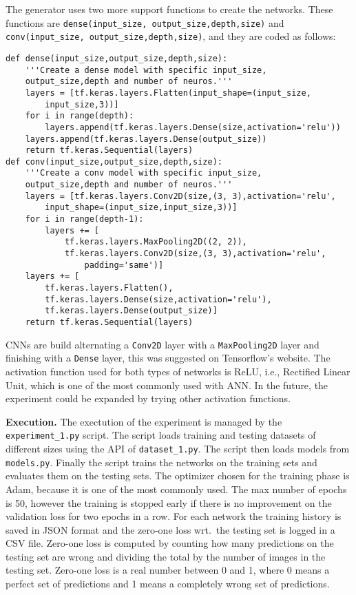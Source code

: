 The generator uses two more support functions to create the networks. These functions are \texttt{dense(input\_size, output\_size,depth,size)} and \texttt{conv(input\_size, output\_size,depth,size)}, and they are coded as follows:
\begin{verbatim}
def dense(input_size,output_size,depth,size):
    '''Create a dense model with specific input_size,
    output_size,depth and number of neuros.'''
    layers = [tf.keras.layers.Flatten(input_shape=(input_size,
        input_size,3))]
    for i in range(depth):
        layers.append(tf.keras.layers.Dense(size,activation='relu'))
    layers.append(tf.keras.layers.Dense(output_size))
    return tf.keras.Sequential(layers)
def conv(input_size,output_size,depth,size):
    '''Create a conv model with specific input_size,
    output_size,depth and number of neuros.'''
    layers = [tf.keras.layers.Conv2D(size,(3, 3),activation='relu',
        input_shape=(input_size,input_size,3))]
    for i in range(depth-1):
        layers += [
            tf.keras.layers.MaxPooling2D((2, 2)),
            tf.keras.layers.Conv2D(size,(3, 3),activation='relu',
                padding='same')]
    layers += [
        tf.keras.layers.Flatten(),
        tf.keras.layers.Dense(size,activation='relu'),
        tf.keras.layers.Dense(output_size)]
    return tf.keras.Sequential(layers)
\end{verbatim}
CNNs are build alternating a \texttt{Conv2D} layer with a \texttt{MaxPooling2D} layer and finishing with a \texttt{Dense} layer, this was suggested on Tensorflow's website. The activation function used for both types of networks is ReLU, i.e., Rectified Linear Unit, which is one of the most commonly used with ANN. In the future, the experiment could be expanded by trying other activation functions.

\textbf{Execution.}
The exectution of the experiment is managed by the \texttt{experiment\_1.py} script. The script loads training and testing datasets of different sizes using the API of \texttt{dataset\_1.py}. The script then loads models from \texttt{models.py}. Finally the script trains the networks on the training sets and evaluates them on the testing sets. The optimizer chosen for the training phase is Adam, because it is one of the most commonly used. The max number of epochs is 50, however the training is stopped early if there is no improvement on the validation loss for two epochs in a row. For each network the training history is saved in JSON format and the zero-one loss wrt.~the testing set is logged in a CSV file. Zero-one loss is computed by counting how many predictions on the testing set are wrong and dividing the total by the number of images in the testing set. Zero-one loss is a real number between 0 and 1, where 0 means a perfect set of predictions and 1 means a completely wrong set of predictions.

